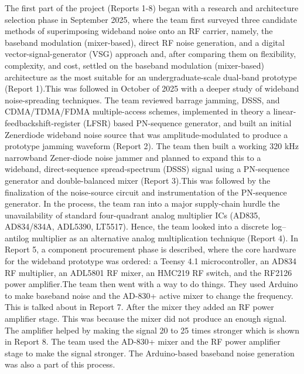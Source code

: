 \documentclass[12pt,a4paper]{report}
\begin{document}
	\vspace{0.5cm}
	
	The first part of the project (Reports 1-8) began with a research and architecture selection phase in September 2025, where the team first surveyed three candidate methods of superimposing wideband noise onto an RF carrier, namely, the baseband modulation (mixer-based), direct RF noise generation, and a digital vector-signal-generator (VSG) approach and, after comparing them on flexibility, complexity, and cost, settled on the baseband modulation (mixer-based) architecture as the most suitable for an undergraduate-scale dual-band prototype (Report 1).This was followed in October of 2025 with a deeper study of wideband noise-spreading techniques. The team reviewed barrage jamming, DSSS, and CDMA/TDMA/FDMA multiple-access schemes, implemented in theory a linear-feedbackshift-register (LFSR) based PN-sequence generator, and built an initial Zenerdiode wideband noise source that was amplitude-modulated to produce a prototype jamming waveform (Report 2). The team then built a working 320 kHz narrowband Zener-diode noise jammer and planned to expand this to a wideband, direct-sequence spread-spectrum (DSSS) signal using a PN-sequence generator and double-balanced mixer (Report 3).This was followed by the finalization of the noise-source circuit and instrumentation of the PN-sequence generator. In the process, the team ran into a major supply-chain hurdle the unavailability of standard four-quadrant analog multiplier ICs (AD835, AD834/834A, ADL5390, LT5517). Hence, the team looked into a discrete log–antilog multiplier as an alternative analog multiplication technique (Report 4). In Report 5, a component procurement phase is described, where the core hardware for the wideband prototype was ordered: a Teensy 4.1 microcontroller, an AD834 RF multiplier, an ADL5801 RF mixer, an HMC219 RF switch, and the RF2126 power amplifier.The team then went with a way to do things. They used Arduino to make baseband noise and the AD-830+ active mixer to change the frequency. This is talked about in Report 7. After the mixer they added an RF power amplifier stage. This was because the mixer did not produce an enough signal. The amplifier helped by making the signal 20 to 25 times stronger which is shown in Report 8. The team used the AD-830+ mixer and the RF power amplifier stage to make the signal stronger. The Arduino-based baseband noise generation was also a part of this process.
	
	\vspace{0.5cm}
	
\end{document}
